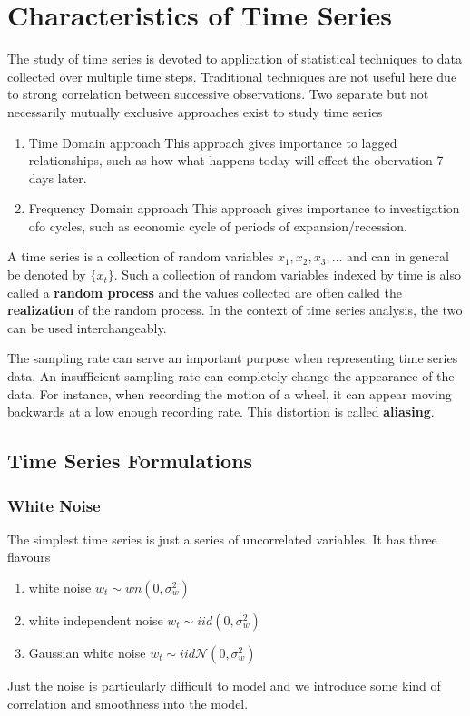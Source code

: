 \documentclass[../time_series_notes.tex]{subfiles}
\begin{document}
    \chapter{Characteristics of Time Series}
    The study of time series is devoted to application of statistical techniques to data collected over multiple time steps. Traditional techniques are not useful here due to strong correlation between successive observations.\newline
    Two separate but not necessarily mutually exclusive approaches exist to study time series
    \begin{enumerate}
        \item Time Domain approach
        This approach gives importance to lagged relationships, such as how what happens today will effect the obervation 7 days later.
        \item Frequency Domain approach
        This approach gives importance to investigation ofo cycles, such as economic cycle of periods of expansion/recession.
    \end{enumerate}

    A time series is a collection of random variables $x_{1}, x_{2}, x_{3}, \ldots$ and can in general be denoted by $\{x_{t}\}$. Such a collection of random variables indexed by time is also called a \textbf{random process} and the values collected are often called the \textbf{realization} of the random process. In the context of time series analysis, the two can be used interchangeably.\newline

    The sampling rate can serve an important purpose when representing time series data. An insufficient sampling rate can completely change the appearance of the data. For instance, when recording the motion of a wheel, it can appear moving backwards at a low enough recording rate. This distortion is called \textbf{aliasing}.

    \section{Time Series Formulations}
    \subsection{White Noise}
    The simplest time series is just a series of uncorrelated variables. It has three flavours
    \begin{enumerate}
        \item white noise $w_{t} \sim wn(0, \sigma_{w}^{2})$
        \item white independent noise $w_{t} \sim iid(0, \sigma_{w}^{2})$
        \item Gaussian white noise $w_{t} \sim iid \mathcal{N}(0, \sigma_{w}^{2})$
    \end{enumerate}
    Just the noise is particularly difficult to model and we introduce some kind of correlation and smoothness into the model.
\end{document}
